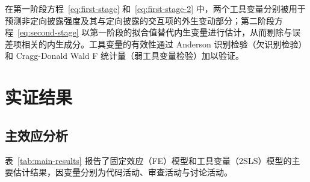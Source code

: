 在第一阶段方程~\eqref{eq:first-stage} 和~\eqref{eq:first-stage-2} 中，两个工具变量分别被用于预测非定向披露强度及其与定向披露的交互项的外生变动部分；第二阶段方程~\eqref{eq:second-stage} 以第一阶段的拟合值替代内生变量进行估计，从而剔除与误差项相关的内生成分。工具变量的有效性通过 Anderson 识别检验（欠识别检验）和 Cragg-Donald Wald F 统计量（弱工具变量检验）加以验证。

\section{实证结果}
\label{sec:results-1}

\subsection{主效应分析}

表~\ref{tab:main-results} 报告了固定效应（FE）模型和工具变量（2SLS）模型的主要估计结果，因变量分别为代码活动、审查活动与讨论活动。

